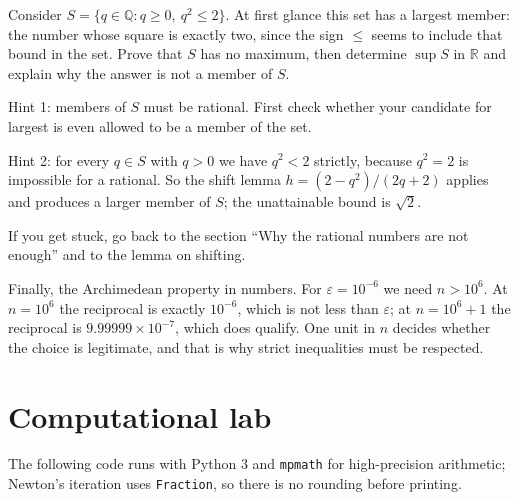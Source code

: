 \begin{tantangan}
Consider $S=\{q\in\mathbb{Q}: q\ge 0,\ q^2\le 2\}$. At first glance this set has a
largest member: the number whose square is exactly two, since the sign $\le$ seems to
include that bound in the set. Prove that $S$ has no maximum, then determine $\sup S$ in
$\mathbb{R}$ and explain why the answer is not a member of $S$.

Hint 1: members of $S$ must be rational. First check whether your candidate for largest
is even allowed to be a member of the set.

Hint 2: for every $q\in S$ with $q>0$ we have $q^2<2$ strictly, because $q^2=2$ is
impossible for a rational. So the shift lemma $h=(2-q^2)/(2q+2)$ applies and produces a
larger member of $S$; the unattainable bound is $\sqrt2$.

If you get stuck, go back to the section ``Why the rational numbers are not enough'' and
to the lemma on shifting.
\end{tantangan}

Finally, the Archimedean property in numbers. For $\varepsilon=10^{-6}$ we need
$n>10^{6}$. At $n=10^{6}$ the reciprocal is exactly $10^{-6}$, which is not less than
$\varepsilon$; at $n=10^{6}+1$ the reciprocal is $9.99999\times10^{-7}$, which does
qualify. One unit in $n$ decides whether the choice is legitimate, and that is why
strict inequalities must be respected.


\section{Computational lab}

The following code runs with Python 3 and \texttt{mpmath} for high-precision
arithmetic; Newton's iteration uses \texttt{Fraction}, so there is no rounding before
printing.

